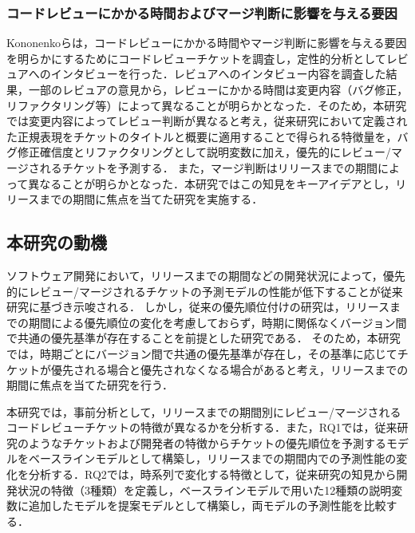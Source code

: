 \documentclass[submit]{ipsj}
\begin{document}
\subsubsection{コードレビューにかかる時間およびマージ判断に影響を与える要因}
Kononenko\cite{release_merge}らは，コードレビューにかかる時間やマージ判断に影響を与える要因を明らかにするためにコードレビューチケットを調査し，定性的分析としてレビュアへのインタビューを行った．レビュアへのインタビュー内容を調査した結果，一部のレビュアの意見から，レビューにかかる時間は変更内容（バグ修正，リファクタリング等）によって異なることが明らかとなった．そのため，本研究では変更内容によってレビュー判断が異なると考え，従来研究\cite{bug}\cite{refactoring}において定義された正規表現をチケットのタイトルと概要に適用することで得られる特徴量を，バグ修正確信度とリファクタリングとして説明変数に加え，優先的にレビュー/マージされるチケットを予測する．
また，マージ判断はリリースまでの期間によって異なることが明らかとなった．本研究ではこの知見をキーアイデアとし，リリースまでの期間に焦点を当てた研究を実施する．

\subsection{本研究の動機}
ソフトウェア開発において，リリースまでの期間などの開発状況によって，優先的にレビュー/マージされるチケットの予測モデルの性能が低下することが従来研究\cite{release_merge}に基づき示唆される．
しかし，従来の優先順位付けの研究\cite{prioritizer}\cite{review_prioritize_pineapple}\cite{prioritize_azeem}\cite{prioritize_fan}は，リリースまでの期間による優先順位の変化を考慮しておらず，時期に関係なくバージョン間で共通の優先基準が存在することを前提とした研究である．
そのため，本研究では，時期ごとにバージョン間で共通の優先基準が存在し，その基準に応じてチケットが優先される場合と優先されなくなる場合があると考え，リリースまでの期間に焦点を当てた研究を行う．

本研究では，事前分析として，リリースまでの期間別にレビュー/マージされるコードレビューチケットの特徴が異なるかを分析する．また，RQ1では，従来研究\cite{prioritizer}のようなチケットおよび開発者の特徴からチケットの優先順位を予測するモデルをベースラインモデルとして構築し，リリースまでの期間内での予測性能の変化を分析する．RQ2では，時系列で変化する特徴として，従来研究\cite{integrator}\cite{release_merge}の知見から開発状況の特徴（3種類）を定義し，ベースラインモデルで用いた12種類の説明変数に追加したモデルを提案モデルとして構築し，両モデルの予測性能を比較する．

\end{document}
